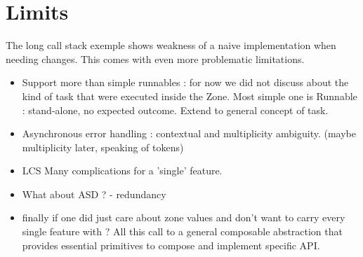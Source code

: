 \section{Limits}

The long call stack exemple shows weakness of a naive implementation when needing changes. This comes with even more problematic limitations.

\begin{itemize}
\item Support more than simple runnables : for now we did not discuss about the kind of task that were executed inside the Zone. Most simple one is Runnable : stand-alone, no expected outcome. Extend to general concept of task.
\item Asynchronous error handling : contextual and multiplicity ambiguity. (maybe multiplicity later, speaking of tokens)
\item LCS Many complications for a 'single' feature.
\item What about ASD ? - redundancy
\item finally if one did just care about zone values and don't want to carry every single feature with ? All this call to a general composable abstraction that provides essential primitives to compose and implement specific API.
\end{itemize}
